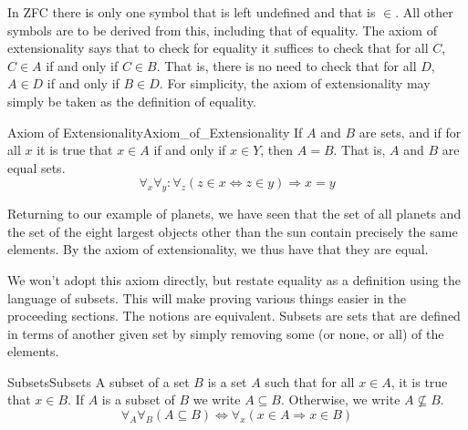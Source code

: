         In ZFC there is only one symbol that is left undefined and that is
        $\in$. All other symbols are to be derived from this, including that of
        equality. The axiom of extensionality says that to check for equality it
        suffices to check that for all $C$, $C\in{A}$ if and only if $C\in{B}$.
        That is, there is no need to check that for all $D$, $A\in{D}$ if and
        only if $B\in{D}$. For simplicity, the axiom of extensionality may
        simply be taken as the definition of equality.
        \begin{faxiom}{Axiom of Extensionality}{Axiom_of_Extensionality}
            If $A$ and $B$ are sets, and if for all $x$ it is true that
            $x\in{A}$ if and only if $x\in{Y}$, then $A=B$. That is, $A$ and $B$
            are equal sets.
            \begin{equation*}
                \forall_{x}\forall_{y}:\forall_{z}(z\in{x}\Leftrightarrow
                z\in{y})\Rightarrow{x}=y
            \end{equation*}
        \end{faxiom}
        \begin{example}
            Returning to our example of planets, we have seen that the set of
            all planets and the set of the eight largest objects other than the
            sun contain precisely the same elements. By the axiom of
            extensionality, we thus have that they are equal.
        \end{example}
        We won't adopt this axiom directly, but restate equality as a definition
        using the language of subsets. This will make proving
        various things easier in the proceeding sections. The notions are
        equivalent. Subsets are sets that are defined in terms of another given
        set by simply removing some (or none, or all) of the elements.
        \begin{fdefinition}{Subsets}{Subsets}
            A \gls{subset} of a \gls{set} $B$ is a set $A$ such that for all
            $x\in{A}$, it is true that $x\in{B}$. If $A$ is a subset of $B$ we
            write $A\subseteq{B}$. Otherwise, we write $A\nsubseteq{B}$.
            \begin{equation*}
                \forall_{A}\forall_{B}(A\subseteq{B})
                \Leftrightarrow
                \forall_{x}(x\in{A}\Rightarrow{x}\in{B})
            \end{equation*}
        \end{fdefinition}

